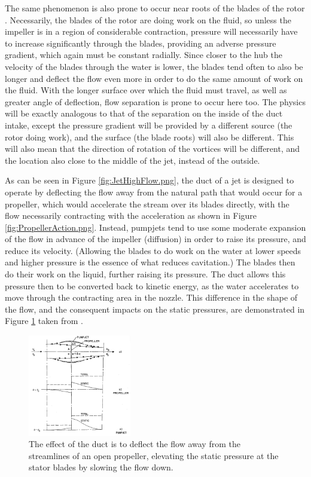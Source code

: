 \documentclass{article}\usepackage[]{graphicx}\usepackage[]{color}
\begin{document}
The same phenomenon is also prone to occur near roots of the blades of the rotor \parencite[15]{henderson1964}.  Necessarily, the blades of the rotor are doing work on the fluid, so unless the impeller is in a region of considerable contraction, pressure will necessarily have to increase significantly through the blades, providing an adverse pressure gradient, which again must be constant radially.  Since closer to the hub the velocity of the blades through the water is lower, the blades tend often to also be longer and deflect the flow even more in order to do the same amount of work on the fluid. With the longer surface over which the fluid must travel, as well as greater angle of deflection, flow separation is prone to occur here too.  The physics will be exactly analogous to that of the separation on the inside of the duct intake, except the pressure gradient will be provided by a different source (the rotor doing work), and the surface (the blade roots) will also be different. This will also mean that the direction of rotation of the vortices will be different, and the location also close to the middle of the jet, instead of the outside.

As can be seen in Figure \ref{fig:JetHighFlow.png}, the duct of a jet is designed to operate by deflecting the flow away from the natural path that would occur for a propeller, which would accelerate the stream over its blades directly, with the flow necessarily contracting with the acceleration as shown in Figure \ref{fig:PropellerAction.png}.   Instead, pumpjets tend to use some moderate expansion of the flow in advance of the impeller (diffusion) in order to raise its pressure, and reduce its velocity.  (Allowing the blades to do work on the water at lower speeds and higher pressure is the essence of what reduces cavitation.)  The blades then do their work on the liquid, further raising its pressure.  The duct allows this pressure then to be converted back to kinetic energy, as the water accelerates to move through the contracting area in the nozzle.  This difference in the shape of the flow, and the consequent impacts on the static pressures, are demonstrated in Figure \ref{fig:FlowComparison.png} taken from \cite{mccormick1963design}.

\begin{figure}
\captionsetup{width=0.4\textwidth}
\includegraphics[width=0.4\textwidth, center]{FlowComparison.png}
\caption{The effect of the duct is to deflect the flow away from the streamlines of an open propeller, elevating the static pressure at the stator blades by slowing the flow down.}
\label{fig:FlowComparison.png}
\end{figure}
\end{document}
